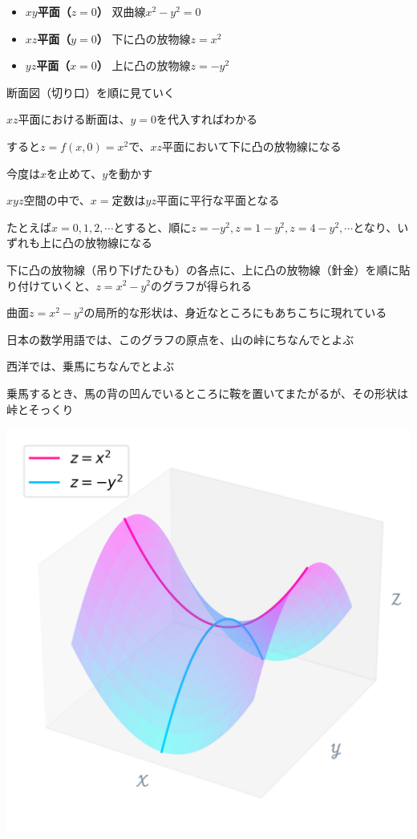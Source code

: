\documentclass[../book_jiriki_calc]{subfiles}
\begin{document}
\begin{itemize}
  \item {\bfseries $xy$平面（$z=0$）} 双曲線$x^2 - y^2 =0$
  \item {\bfseries $xz$平面（$y=0$）} 下に凸の放物線$z=x^2$
  \item {\bfseries $yz$平面（$x=0$）} 上に凸の放物線$z=-y^2$
\end{itemize}

断面図（切り口）を順に見ていく

\br

$xz$平面における断面は、$y=0$を代入すればわかる

すると$z=f(x,0)=x^2$で、$xz$平面において下に凸の放物線になる

\br

今度は$x$を止めて、$y$を動かす

$xyz$空間の中で、$x=\text{定数}$は$yz$平面に平行な平面となる

たとえば$x=0,1,2,\cdots$とすると、順に$z=-y^2, z=1-y^2, z=4-y^2,\cdots$となり、いずれも上に凸の放物線になる

\br

下に凸の放物線（吊り下げたひも）の各点に、上に凸の放物線（針金）を順に貼り付けていくと、$z=x^2-y^2$のグラフが得られる

\sectionline

曲面$z=x^2-y^2$の局所的な形状は、身近なところにもあちこちに現れている

\br

日本の数学用語では、このグラフの原点を、山の峠にちなんでとよぶ

西洋では、乗馬にちなんでとよぶ

乗馬するとき、馬の背の凹んでいるところに鞍を置いてまたがるが、その形状は峠とそっくり

\br

\includegraphics[width=0.9\linewidth]{./python/graph_x-pow2-sub-y-pow2_02.png}
\end{document}
